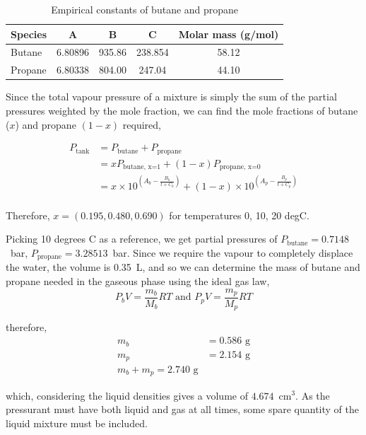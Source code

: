 \documentclass[12pt]{article}
\begin{document}
\begin{table}[htbp]
   \centering
   \caption{Empirical constants of butane and propane}
   \begin{tabular}{@{} lSSSS @{}}
      \toprule
       Species & A & B & C & {Molar mass (g/mol)}\\
      \midrule
Butane & 6.80896 & 935.86 & 238.854 & 58.12\\
Propane & 6.80338 & 804.00 & 247.04 & 44.10\\
      \bottomrule
   \end{tabular}
   \label{tbl:empiricalConstants}
\end{table}

Since the total vapour pressure of a mixture is simply the sum of the partial pressures weighted by the mole fraction, we can find the mole fractions of butane ($x$) and propane $(1-x)$ required,

\begin{align}
P_\text{tank} &= P_\text{butane} + P_\text{propane}\\
& = x P_\text{butane, x=1} + (1-x) P_\text{propane, x=0}\\
&= x \times 10^{\left(A_b - \frac{B_b}{t+C_b}\right)} + (1-x) \times 10^{\left(A_p - \frac{B_p}{t+C_p}\right)}\\
\end{align}

Therefore, $x = (0.195,  0.480, 0.690)$ for temperatures 0, 10, 20 degC. 

Picking 10 degrees C as a reference, we get  partial pressures of $P_\text{butane} = 0.7148$~bar, $P_\text{propane} = 3.28513$~bar. Since we require the vapour to completely displace the water, the volume is 0.35~L, and so we can determine the mass of butane and propane needed in the gaseous phase using the ideal gas law,
\begin{equation}
P_b V = \frac{m_b}{M_b} RT \text{ and } P_p V = \frac{m_p}{M_p} RT
\end{equation}

therefore,
\begin{align}
m_b &= 0.586\text{ g}\\
m_p &= 2.154\text{ g}\\
m_b + m_p = 2.740\text{ g}
\end{align}

which, considering the liquid densities gives a volume of $4.674$~cm$^3$. As the pressurant must have both liquid and gas at all times, some spare quantity of the liquid mixture must be included. 
\end{document}
